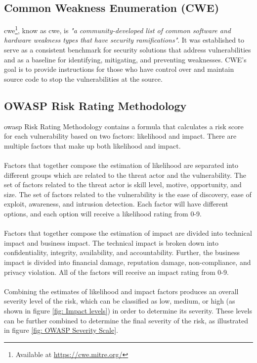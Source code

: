 \subsection{Common Weakness Enumeration (CWE)}
\label{cwe}
\acrlong{cwe}\footnote{Available at \url{https://cwe.mitre.org/}}, know as \acrshort{cwe}, is \textit{"a community-developed list of common software and hardware weakness types that have security ramifications"}\cite{CWE}. It was established to serve as a consistent benchmark for security solutions that address vulnerabilities and as a baseline for identifying, mitigating, and preventing weaknesses. CWE's goal is to provide instructions for those who have control over and maintain source code to stop the vulnerabilities at the source. 

\subsection{OWASP Risk Rating Methodology}
\acrshort{owasp} Risk Rating Methodology contains a formula that calculates a risk score for each vulnerability based on two factors: likelihood and impact. There are multiple factors that make up both likelihood and impact. 
\\~\\
Factors that together compose the estimation of likelihood are separated into different groups which are related to the threat actor and the vulnerability. The set of factors related to the threat actor is skill level, motive, opportunity, and size. The set of factors related to the vulnerability is the ease of discovery, ease of exploit, awareness, and intrusion detection. Each factor will have different options, and each option will receive a likelihood rating from 0-9. 
\\~\\
Factors that together compose the estimation of impact are divided into technical impact and business impact. The technical impact is broken down into confidentiality, integrity, availability, and accountability. Further, the business impact is divided into financial damage, reputation damage, non-compliance, and privacy violation. All of the factors will receive an impact rating from 0-9. 
\\~\\
Combining the estimates of likelihood and impact factors produces an overall severity level of the risk, which can be classified as low, medium, or high (as shown in figure \ref{fig: Impact levels}) in order to determine its severity. These levels can be further combined to determine the final severity of the risk, as illustrated in figure \ref{fig: OWASP Severity Scale}.
\cite{owasprisk}

